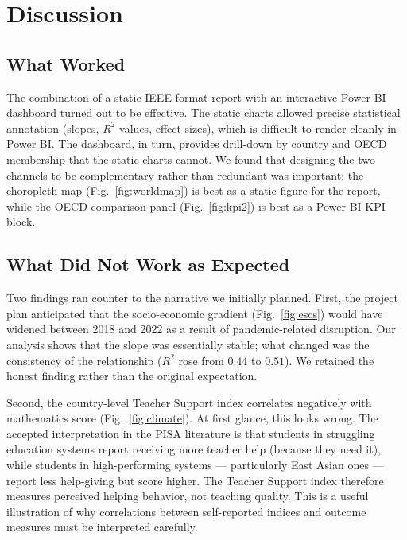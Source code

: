 \documentclass[conference]{IEEEtran}
\begin{document}
\section{Discussion}
\label{sec:discussion}

\subsection{What Worked}

The combination of a static IEEE-format report with an interactive Power BI dashboard turned out to be effective. The static charts allowed precise statistical annotation (slopes, $R^{2}$ values, effect sizes), which is difficult to render cleanly in Power BI. The dashboard, in turn, provides drill-down by country and OECD membership that the static charts cannot. We found that designing the two channels to be complementary rather than redundant was important: the choropleth map (Fig.~\ref{fig:worldmap}) is best as a static figure for the report, while the OECD comparison panel (Fig.~\ref{fig:kpi2}) is best as a Power BI KPI block.

\subsection{What Did Not Work as Expected}

Two findings ran counter to the narrative we initially planned. First, the project plan anticipated that the socio-economic gradient (Fig.~\ref{fig:escs}) would have widened between 2018 and 2022 as a result of pandemic-related disruption. Our analysis shows that the slope was essentially stable; what changed was the consistency of the relationship ($R^{2}$ rose from $0.44$ to $0.51$). We retained the honest finding rather than the original expectation.

Second, the country-level Teacher Support index correlates negatively with mathematics score (Fig.~\ref{fig:climate}). At first glance, this looks wrong. The accepted interpretation in the PISA literature is that students in struggling education systems report receiving more teacher help (because they need it), while students in high-performing systems --- particularly East Asian ones --- report less help-giving but score higher. The Teacher Support index therefore measures perceived helping behavior, not teaching quality. This is a useful illustration of why correlations between self-reported indices and outcome measures must be interpreted carefully.
\end{document}
